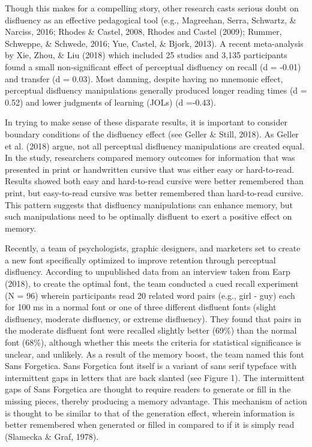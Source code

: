 \documentclass[jou]{apa6}
\begin{document}
Though this makes for a compelling story, other research casts serious doubt on disfluency as an effective pedagogical tool (e.g., Magreehan, Serra, Schwartz, \& Narciss, 2016; Rhodes \& Castel, 2008, Rhodes and Castel (2009); Rummer, Schweppe, \& Schwede, 2016; Yue, Castel, \& Bjork, 2013). A recent meta-analysis by Xie, Zhou, \& Liu (2018) which included 25 studies and 3,135 participants found a small non-significant effect of perceptual disfluency on recall (d = -0.01) and transfer (d = 0.03). Most damning, despite having no mnemonic effect, perceptual disfluency manipulations generally produced longer reading times (d = 0.52) and lower judgments of learning (JOLs) (d =-0.43).

In trying to make sense of these disparate results, it is important to consider boundary conditions of the disfluency effect (see Geller \& Still, 2018). As Geller et al. (2018) argue, not all perceptual disfluency manipulations are created equal. In the study, researchers compared memory outcomes for information that was presented in print or handwritten cursive that was either easy or hard-to-read. Results showed both easy and hard-to-read cursive were better remembered than print, but easy-to-read cursive was better remembered than hard-to-read cursive. This pattern suggests that disfluency manipulations can enhance memory, but such manipulations need to be optimally disfluent to exert a positive effect on memory.

Recently, a team of psychologists, graphic designers, and marketers set to create a new font specifically optimized to improve retention through perceptual disfluency. According to unpublished data from an interview taken from Earp (2018), to create the optimal font, the team conducted a cued recall experiment (N = 96) wherein participants read 20 related word pairs (e.g., girl - guy) each for 100 ms in a normal font or one of three different disfluent fonts (slight disfluency, moderate disfluency, or extreme disfluency). They found that pairs in the moderate disfluent font were recalled slightly better (69\%) than the normal font (68\%), although whether this meets the criteria for statistical significance is unclear, and unlikely. As a result of the memory boost, the team named this font Sans Forgetica. Sans Forgetica font itself is a variant of sans serif typeface with intermittent gaps in letters that are back slanted (see Figure 1). The intermittent gaps of Sans Forgetica are thought to require readers to generate or fill in the missing pieces, thereby producing a memory advantage. This mechanism of action is thought to be similar to that of the generation effect, wherein information is better remembered when generated or filled in compared to if it is simply read (Slamecka \& Graf, 1978).
\end{document}
